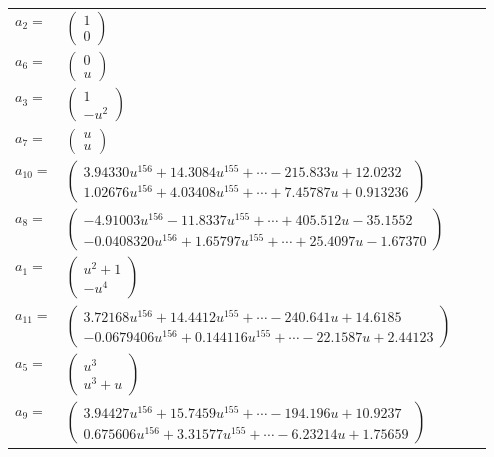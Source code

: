 \documentclass[1p]{elsarticle_modified}
\theoremstyle{definition}
\begin{document}
\begin{tabular}{m{7pt} m{180pt} m{7pt} m{180pt} }
\flushright $a_{2}=$&$\begin{pmatrix}1\\0\end{pmatrix}$ \\
\flushright $a_{6}=$&$\begin{pmatrix}0\\u\end{pmatrix}$ \\
\flushright $a_{3}=$&$\begin{pmatrix}1\\- u^2\end{pmatrix}$ \\
\flushright $a_{7}=$&$\begin{pmatrix}u\\u\end{pmatrix}$ \\
\flushright $a_{10}=$&$\begin{pmatrix}3.94330 u^{156}+14.3084 u^{155}+\cdots-215.833 u+12.0232\\1.02676 u^{156}+4.03408 u^{155}+\cdots+7.45787 u+0.913236\end{pmatrix}$ \\
\flushright $a_{8}=$&$\begin{pmatrix}-4.91003 u^{156}-11.8337 u^{155}+\cdots+405.512 u-35.1552\\-0.0408320 u^{156}+1.65797 u^{155}+\cdots+25.4097 u-1.67370\end{pmatrix}$ \\
\flushright $a_{1}=$&$\begin{pmatrix}u^2+1\\- u^4\end{pmatrix}$ \\
\flushright $a_{11}=$&$\begin{pmatrix}3.72168 u^{156}+14.4412 u^{155}+\cdots-240.641 u+14.6185\\-0.0679406 u^{156}+0.144116 u^{155}+\cdots-22.1587 u+2.44123\end{pmatrix}$ \\
\flushright $a_{5}=$&$\begin{pmatrix}u^3\\u^3+u\end{pmatrix}$ \\
\flushright $a_{9}=$&$\begin{pmatrix}3.94427 u^{156}+15.7459 u^{155}+\cdots-194.196 u+10.9237\\0.675606 u^{156}+3.31577 u^{155}+\cdots-6.23214 u+1.75659\end{pmatrix}$ \\

\end{tabular}
\end{document}
